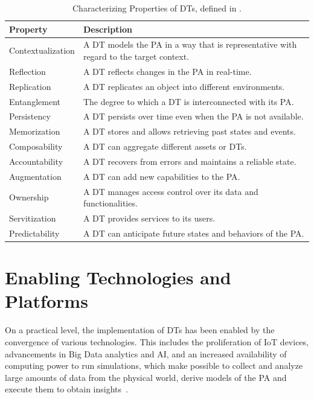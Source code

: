 \begin{table}[t]
\centering
\caption{Characterizing Properties of \acp{DT}, defined in \cite{dt-IoT-context-Minerva-2020}.}
\renewcommand{\arraystretch}{1.3}
\begin{tabular}{p{3.5cm}|p{\dimexpr\textwidth-4.5cm\relax}}
\toprule
\midrule
\textbf{Property} & \textbf{Description} \\
\midrule
\toprule
{Contextualization} & A \ac{DT} models the \ac{PA} in a way that is representative with regard to the target context. \\
\hline
{Reflection} & A \ac{DT} reflects changes in the \ac{PA} in real-time. \\
\hline
{Replication} & A \ac{DT} replicates an object into different environments. \\
\hline
{Entanglement} & The degree to which a \ac{DT} is interconnected with its \ac{PA}. \\
\hline
{Persistency} & A \ac{DT} persists over time even when the \ac{PA} is not available. \\
\hline
{Memorization} & A \ac{DT} stores and allows retrieving past states and events. \\
\hline
{Composability} & A \ac{DT} can aggregate different assets or \acp{DT}. \\
\hline
{Accountability} & A \ac{DT} recovers from errors and maintains a reliable state.\\
\hline
{Augmentation} & A \ac{DT} can add new capabilities to the \ac{PA}.\\
\hline
{Ownership} & A \ac{DT} manages access control over its data and functionalities.\\
\hline
{Servitization} & A \ac{DT} provides services to its users.\\
\hline
{Predictability} & A \ac{DT} can anticipate future states and behaviors of the \ac{PA}.\\
\midrule
\bottomrule
\end{tabular}%
\label{tab:minerva-properties}
\end{table}



\section{Enabling Technologies and Platforms}

On a practical level, the implementation of \acp{DT} has been enabled by the convergence of various technologies.
%
This includes the proliferation of \ac{IoT} devices, 
advancements in Big Data analytics and \ac{AI}, 
and an increased availability of computing power to run simulations, 
which make possible to collect and analyze large amounts of data from the physical world, 
derive models of the \ac{PA} and execute them to obtain insights~\cite{qi2021enablingtechdt,Fuller_Fan_Day_Barlow_2020,Mihai_survey_enabling_2022}.

